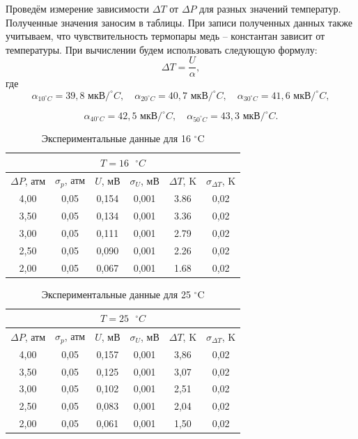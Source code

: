 \documentclass[12pt,a4paper]{article}
\begin{document}
Проведём измерение зависимости $ \Delta T $ от $ \Delta P $ для разных значений температур. Полученные значения заносим в таблицы. При записи полученных данных также учитываем, что чувствительность термопары медь -- константан зависит от температуры. При вычислении будем использовать следующую формулу: \[ \Delta T = \frac{U}{\alpha}, \] где \[
\alpha_{10^\circ C} = 39,8 \text{ мкВ}/^\circ C, \quad \alpha_{20^\circ C} = 40,7 \text{ мкВ}/^\circ C, \quad \alpha_{30^\circ C} = 41,6 \text{ мкВ}/^\circ C, \]

\[\alpha_{40^\circ C} = 42,5 \text{ мкВ}/^\circ C, \quad \alpha_{50^\circ C} = 43,3 \text{ мкВ}/^\circ C . \]


\begin{table}[H]
	\centering
	\begin{tabular}{|c|c|c|c|c|c|}
		\hline
		\multicolumn{6}{|c|}{$ T = 16 \text{ } ^\circ C $} \\ \hline
		$ \Delta P $, атм & $ \sigma_p $, атм & $ U $, мВ & $ \sigma_U $, мВ & $ \Delta T $, K & $ \sigma_{\Delta T} $, K \\ \hline
		4,00 & 0,05 & 0,154 & 0,001 & 3.86 & 0,02 \\ \hline
		3,50 & 0,05 & 0,134 & 0,001 & 3.36 & 0,02 \\ \hline
		3,00 & 0,05 & 0,111 & 0,001 & 2.79 & 0,02 \\ \hline
		2,50 & 0,05 & 0,090 & 0,001 & 2.26 & 0,02 \\ \hline
		2,00 & 0,05 & 0,067 & 0,001 & 1.68 & 0,02 \\ \hline
	\end{tabular}
	\caption{Экспериментальные данные для 16 $^\circ$C}
	\label{tab:10C}
\end{table}

\begin{table}[H]
	\centering
	\begin{tabular}{|c|c|c|c|c|c|}
		\hline
		\multicolumn{6}{|c|}{$ T = 25 \text{ } ^\circ C $} \\ \hline
		$ \Delta P $, атм & $ \sigma_p $, атм & $ U $, мВ & $ \sigma_U $, мВ & $ \Delta T $, K & $ \sigma_{\Delta T} $, K \\ \hline
		4,00 & 0,05 & 0,157 & 0,001 & 3,86 & 0,02 \\ \hline
		3,50 & 0,05 & 0,125 & 0,001 & 3,07 & 0,02 \\ \hline
		3,00 & 0,05 & 0,102 & 0,001 & 2,51 & 0,02 \\ \hline
		2,50 & 0,05 & 0,083 & 0,001 & 2,04 & 0,02 \\ \hline
		2,00 & 0,05 & 0,061 & 0,001 & 1,50 & 0,02 \\ \hline
	\end{tabular}
	\caption{Экспериментальные данные для 25 $^\circ$C}
	\label{tab:20C}
\end{table}
\end{document}
